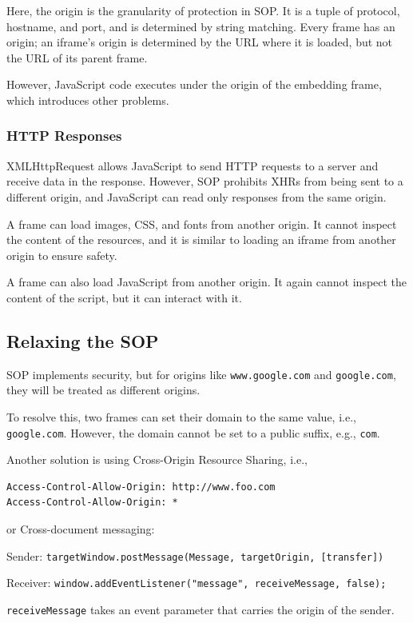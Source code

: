 Here, the origin is the granularity of protection in SOP. It is a tuple of protocol, hostname, and port, and is determined by string matching. Every frame has an origin; an iframe's origin is determined by the URL where it is loaded, but not the URL of its parent frame. 

However, JavaScript code executes under the origin of the embedding frame, which introduces other problems. 

\subsubsection{HTTP Responses}
XMLHttpRequest allows JavaScript to send HTTP requests to a server and receive data in the response. However, SOP prohibits XHRs from being sent to a different origin, and JavaScript can read only responses from the same origin.

A frame can load images, CSS, and fonts from another origin. It cannot inspect the content of the resources, and it is similar to loading an iframe from another origin to ensure safety. 

A frame can also load JavaScript from another origin. It again cannot inspect the content of the script, but it can interact with it.

\subsection{Relaxing the SOP}
SOP implements security, but for origins like \texttt{www.google.com} and \texttt{google.com}, they will be treated as different origins. 

To resolve this, two frames can set their domain to the same value, i.e., \texttt{google.com}. However, the domain cannot be set to a public suffix, e.g., \texttt{com}. 

Another solution is using Cross-Origin Resource Sharing, i.e., 

\begin{verbatim}
Access-Control-Allow-Origin: http://www.foo.com
Access-Control-Allow-Origin: *
\end{verbatim}

or Cross-document messaging: 

Sender: \texttt{targetWindow.postMessage(Message, targetOrigin, [transfer])}

Receiver: \texttt{window.addEventListener("message", receiveMessage, false);}

\texttt{receiveMessage} takes an event parameter that carries the origin of the sender.